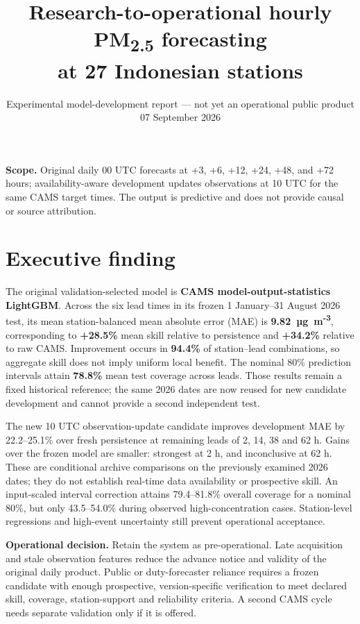 \documentclass[11pt,a4paper]{article}
\title{\sffamily\bfseries Research-to-operational hourly PM\textsubscript{2.5} forecasting\\at 27 Indonesian stations}
\author{}
\date{Experimental model-development report --- not yet an operational public product\\07 September 2026}
\newcommand{\highlight}[1]{\colorbox{Soft}{\parbox{0.94\linewidth}{#1}}}
\begin{document}
\maketitle
\vfill
\highlight{\textbf{Scope.} Original daily 00 UTC forecasts at +3, +6, +12, +24, +48, and +72 hours; availability-aware development updates observations at 10 UTC for the same CAMS target times. The output is predictive and does not provide causal or source attribution.}
\vfill
\thispagestyle{empty}
\clearpage
\tableofcontents
\clearpage

\section{Executive finding}
The original validation-selected model is \textbf{CAMS model-output-statistics LightGBM}. Across the six lead times in its frozen 1 January--31 August 2026 test, its mean station-balanced mean absolute error (MAE) is \textbf{9.82~µg~m\textsuperscript{-3}}, corresponding to \textbf{+28.5\%} mean skill relative to persistence and \textbf{+34.2\%} relative to raw CAMS. Improvement occurs in \textbf{94.4\%} of station--lead combinations, so aggregate skill does not imply uniform local benefit. The nominal 80\% prediction intervals attain \textbf{78.8\%} mean test coverage across leads. Those results remain a fixed historical reference; the same 2026 dates are now reused for new candidate development and cannot provide a second independent test.

The new 10 UTC observation-update candidate improves development MAE by 22.2–25.1\% over fresh persistence at remaining leads of 2, 14, 38 and 62 h. Gains over the frozen model are smaller: strongest at 2 h, and inconclusive at 62 h. These are conditional archive comparisons on the previously examined 2026 dates; they do not establish real-time data availability or prospective skill. An input-scaled interval correction attains 79.4–81.8\% overall coverage for a nominal 80\%, but only 43.5–54.0\% during observed high-concentration cases. Station-level regressions and high-event uncertainty still prevent operational acceptance.

\highlight{\textbf{Operational decision.} Retain the system as pre-operational. Late acquisition and stale observation features reduce the advance notice and validity of the original daily product. Public or duty-forecaster reliance requires a frozen candidate with enough prospective, version-specific verification to meet declared skill, coverage, station-support and reliability criteria. A second CAMS cycle needs separate validation only if it is offered.}
\end{document}
